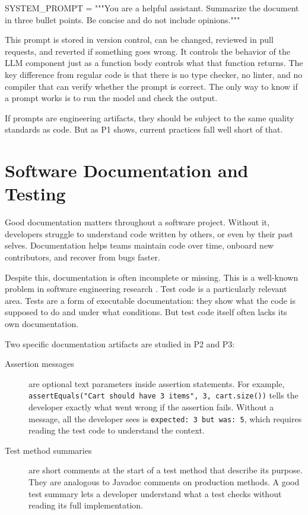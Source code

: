 \documentclass[
    pdftex,
    final,
    11pt,
    a4paper,
    parskip=false,
    oneside,
    footheight=0mm,
    footinclude=false,
    toc=bibliography
]{scrbook}
\begin{document}
\begin{code}
SYSTEM_PROMPT = """You are a helpful assistant.
Summarize the document in three bullet points.
Be concise and do not include opinions."""
\end{code}

This prompt is stored in version control, can be changed, reviewed in pull requests, and reverted if something goes wrong. It controls the behavior of the LLM component just as a function body controls what that function returns. The key difference from regular code is that there is no type checker, no linter, and no compiler that can verify whether the prompt is correct. The only way to know if a prompt works is to run the model and check the output.

If prompts are engineering artifacts, they should be subject to the same quality standards as code. But as P1 shows, current practices fall well short of that.

\section{Software Documentation and Testing}

Good documentation matters throughout a software project. Without it, developers struggle to understand code written by others, or even by their past selves. Documentation helps teams maintain code over time, onboard new contributors, and recover from bugs faster.

Despite this, documentation is often incomplete or missing. This is a well-known problem in software engineering research \cite{Ciniselli2021}. Test code is a particularly relevant area. Tests are a form of executable documentation: they show what the code is supposed to do and under what conditions. But test code itself often lacks its own documentation.

Two specific documentation artifacts are studied in P2 and P3:

\begin{description}
    \item[Assertion messages] are optional text parameters inside assertion statements. For example, \texttt{assertEquals("Cart should have 3 items", 3, cart.size())} tells the developer exactly what went wrong if the assertion fails. Without a message, all the developer sees is \texttt{expected: 3 but was: 5}, which requires reading the test code to understand the context.

    \item[Test method summaries] are short comments at the start of a test method that describe its purpose. They are analogous to Javadoc comments on production methods. A good test summary lets a developer understand what a test checks without reading its full implementation.
\end{description}
\end{document}
